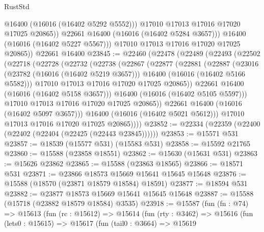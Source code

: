 \begin{lexlean}{RustStd}
\begin{coremodule}
                  @16400
                  (@16016 (@16402 @5292 @5552)))
                @17010
                @17013
                @17016
                @17020
                @17025
                @20865))
            @22661
            @16400
            (@16016 (@16402 @5284 @3657)))
          @16400
          (@16016 (@16402 @5227 @5567)))
        @17010
        @17013
        @17016
        @17020
        @17025
        @20865))
    @22661
    @16400
@23845 := @22460
    (@22478
      (@22489
        (@22493
          (@22502
            (@22718
              (@22728
                (@22732
                  (@22738
                    (@22867
                      (@22877
                        (@22881
                          (@22887
                            (@23016
                              (@23782 (@16016 (@16402 @5219 @3657)))
                              @16400
                              (@16016 (@16402 @5166 @5582)))
                            @17010
                            @17013
                            @17016
                            @17020
                            @17025
                            @20865))
                        @22661
                        @16400
                        (@16016 (@16402 @5158 @3657)))
                      @16400
                      (@16016 (@16402 @5105 @5597)))
                    @17010
                    @17013
                    @17016
                    @17020
                    @17025
                    @20865))
                @22661
                @16400
                (@16016 (@16402 @5097 @3657)))
              @16400
              (@16016 (@16402 @5021 @5612)))
            @17010
            @17013
            @17016
            @17020
            @17025
            @20865))))
@23852 := @22334 (@22359 (@22400 (@22402 (@22404 (@22425 (@22443 @23845))))))
@23853 := @15571 @531
@23857 := @18539 (@15577 @531) (@15583 @531)
@23858 := @15592 @21765
@23860 := @15588 (@23858 @18551)
@23862 := @15630 (@15631 @531)
@23863 := @15626 @23862
@23865 := @15588 (@23863 @18565)
@23866 := @18571 @531
@23871 := @23866 @18573 @15669 @15641 @15645 @15648
@23876 := @15588 (@18570 (@23871 @18579 @18584) @18591)
@23877 := @18594 @531
@23882 := @23877 @18573 @15669 @15641 @15645 @15648
@23887 := @15588 (@15718 (@23882 @18579 @18584) @3535)
@23918 := @15587
    (fun (fn : @74) =>
    @15613
      (fun (rc : @15612) =>
      @15614
        (fun (rty : @3462) =>
        @15616
          (fun (lets0 : @15615) =>
          @15617
            (fun (tail0 : @3664) =>
            @15619

\end{coremodule}
\end{lexlean}
